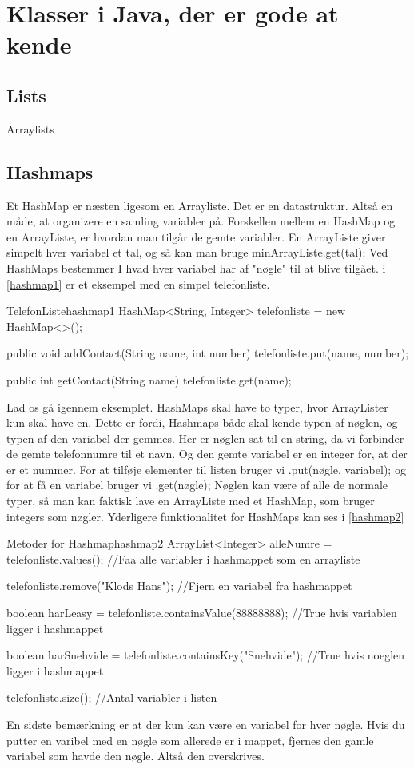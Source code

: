 \section{Klasser i Java, der er gode at kende}

\subsection{Lists}

Arraylists

\subsection{Hashmaps}
Et HashMap er næsten ligesom en Arrayliste. Det er en datastruktur. Altså en måde, at organizere en samling variabler på. Forskellen mellem en HashMap og en ArrayListe, er hvordan man tilgår de gemte variabler. En ArrayListe giver simpelt hver variabel et tal, og så kan man bruge minArrayListe.get(tal); Ved HashMaps bestemmer I hvad hver variabel har af "nøgle" til at blive tilgået. i \autoref{hashmap1} er et eksempel med en simpel telefonliste.
\begin{JavaCode}{TelefonListe}{hashmap1}
	HashMap<String, Integer> telefonliste = new HashMap<>();
	
	public void addContact(String name, int number){
		telefonliste.put(name, number);
	}
	
	public int getContact(String name){
		telefonliste.get(name);	
	}
\end{JavaCode}
Lad os gå igennem eksemplet. HashMaps skal have to typer, hvor ArrayLister kun skal have en. Dette er fordi, Hashmaps både skal kende typen af nøglen, og typen af den variabel der gemmes. Her er nøglen sat til en string, da vi forbinder de gemte telefonnumre til et navn. Og den gemte variabel er en integer for, at  der er et nummer.  For at tilføje elementer til listen bruger vi .put(nøgle, variabel); og for at få en variabel bruger vi .get(nøgle); Nøglen kan være af alle de normale typer, så man kan faktisk lave en ArrayListe med et HashMap, som bruger integers som nøgler. Yderligere funktionalitet for HashMaps kan ses i \autoref{hashmap2}
\begin{JavaCode}{Metoder for Hashmap}{hashmap2}
	ArrayList<Integer> alleNumre = telefonliste.values();
	//Faa alle variabler i hashmappet som en arrayliste
	
	telefonliste.remove("Klods Hans");
	//Fjern en variabel fra hashmappet
	
	boolean harLeasy = telefonliste.containsValue(88888888);
	//True hvis variablen ligger i hashmappet
	
	boolean harSnehvide = telefonliste.containsKey("Snehvide");
	//True hvis noeglen ligger i hashmappet
	
	telefonliste.size();
	//Antal variabler i listen
\end{JavaCode}
En sidste bemærkning er at der kun kan være en variabel for hver nøgle. Hvis du putter en varibel med en nøgle som allerede er i mappet, fjernes den gamle variabel som havde den nøgle. Altså den overskrives.

